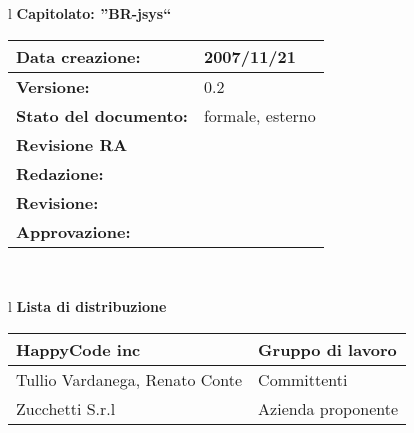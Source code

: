 

\newcommand{\lv}{ 0.2 } %
\newcommand{\dt}{ Piano Consuntivo }%
\newcommand{\Glossario}{ Glossario.1.8.pdf }


\begin{center}
\thispagestyle{plain}
\begin{table}[htbp]
\large{
\begin{tabular}{l}
\Large{\textbf{\textsf{Capitolato: ''BR-jsys``}}} \\
\begin{tabular}{|p{6cm}|p{6cm}|} \hline
\textbf{Data creazione:} & 2007/11/21 \\ \hline
\textbf{Versione:} & \lv \\ \hline
\textbf{Stato del documento:} & formale, esterno \\ \hline
\textbf{Revisione RA} &  \\ \hline
\textbf{Redazione:} & \ET \\ \hline
\textbf{Revisione:} & \MT \\ \hline
\textbf{Approvazione:} & \AT \\ \hline
\end{tabular} \\
\end{tabular}
}
\end{table}

\begin{table}[hbtp]
\large{
\begin{tabular}{l}
\Large{\textbf{\textsf{Lista di distribuzione}}} \\
\begin{tabular}{|p{6cm}|p{6cm}|} \hline
{HappyCode inc}& Gruppo di lavoro\\ \hline
{Tullio Vardanega, Renato Conte}& Committenti \\ \hline 
{Zucchetti S.r.l}& Azienda proponente\\ \hline
\end{tabular} \\
\end{tabular}
}
\end{table}
\begin{table}[hbtp]


\end{table}
\end{center}
